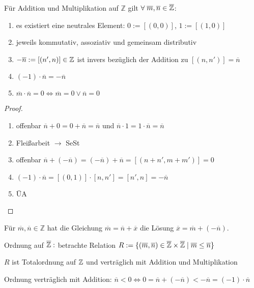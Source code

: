 \begin{satz}
	Für Addition und Multiplikation auf $\mathbb Z$ gilt $\forall\;\overline m, 
	\overline{n} \in \overline{\mathbb{Z}}$:
	\begin{enumerate}
		\item es existiert eine neutrales Element: $0:=[(0,0)]$, $1:=[(1,0)]$
		\item jeweils kommutativ, assoziativ und gemeinsam distributiv
		\item $- \overline{n} := [(n',n)] \in \mathbb{Z}$ ist invers bezüglich der Addition zu 
		$[(n,n')] = \overline n$
		\item $(-1) \cdot \overline n = - \overline n$
		\item $\overline m \cdot \overline n = 0 \iff \overline m =0 \lor \overline n=0$
	\end{enumerate}
\end{satz}

\begin{proof}
	\begin{enumerate}[label={\arabic*)}, nolistsep]
		\item offenbar $\overline n +0=0+\overline n=\overline n$ und $\overline n \cdot 1 = 1 \cdot 
		\overline n = \overline n$
		\item Fleißarbeit $\to$ SeSt
		\item offenbar $\overline n+(- \overline n) = (- \overline n)+\overline n=[(n+n',m+m')]=0$
		\item $(-1)\cdot \overline n = [(0,1)]\cdot [n,n']=[n',n]=-\overline n$
		\item ÜA \QEDA
	\end{enumerate}
		
\end{proof}

\begin{satz}
	Für $\overline m, \overline n \in \mathbb Z$ hat die Gleichung $\overline m=\overline n + \overline x$ die Lösung $\overline x=\overline m+(-\overline n)$.
\end{satz}

\noindent Ordnung auf $\overline{\mathbb{Z}}:$ betrachte Relation $R := \{(\overline{m},\overline{n}) \in 
\overline{\mathbb{Z}} \times \overline{\mathbb{Z}} \mid \overline{m} \le \overline{n}\}$

\begin{satz}
	$R$ ist Totalordnung auf $\mathbb{Z}$ und verträglich mit Addition und 
	Multiplikation
\end{satz}

\noindent Ordnung verträglich mit Addition: $\overline n < 0 \iff 0=\overline n+(-\overline n) < -\overline n
= (-1) \cdot \overline n$ \\

